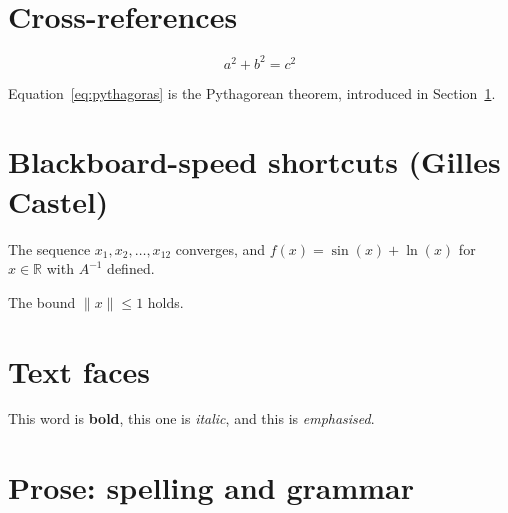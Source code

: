 \documentclass{article}
\begin{document}
\section{Cross-references}
\label{sec:refs}

\begin{equation}
    \label{eq:pythagoras}
    a^2 + b^2 = c^2
\end{equation}

Equation~\eqref{eq:pythagoras} is the Pythagorean theorem, introduced in
Section~\ref{sec:refs}.


\section{Blackboard-speed shortcuts (Gilles Castel)}

The sequence $x_1, x_2, \ldots, x_{12}$ converges, and
$f(x) = \sin(x) + \ln(x)$ for $x \in \mathbb{R}$ with $A^{-1}$ defined.

The bound $\lVert x \rVert \leq 1$ holds.

\section{Text faces}

This word is \textbf{bold}, this one is \textit{italic}, and this is
\emph{emphasised}.

\section{Prose: spelling and grammar}
\end{document}
